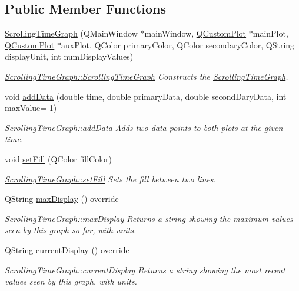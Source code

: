 \subsection*{Public Member Functions}
\begin{DoxyCompactItemize}
\item 
\hyperlink{class_scrolling_time_graph_ac7af242514d5770d99d90743a24163ca}{Scrolling\+Time\+Graph} (Q\+Main\+Window $\ast$main\+Window, \hyperlink{class_q_custom_plot}{Q\+Custom\+Plot} $\ast$main\+Plot, \hyperlink{class_q_custom_plot}{Q\+Custom\+Plot} $\ast$aux\+Plot, Q\+Color primary\+Color, Q\+Color secondary\+Color, Q\+String display\+Unit, int num\+Display\+Values)
\begin{DoxyCompactList}\small\item\em \hyperlink{class_scrolling_time_graph_ac7af242514d5770d99d90743a24163ca}{Scrolling\+Time\+Graph\+::\+Scrolling\+Time\+Graph} Constructs the \hyperlink{class_scrolling_time_graph}{Scrolling\+Time\+Graph}. \end{DoxyCompactList}\item 
void \hyperlink{class_scrolling_time_graph_af26f732b60d98c521ea93709db8f70cc}{add\+Data} (double time, double primary\+Data, double second\+Dary\+Data, int max\+Value=-\/1)
\begin{DoxyCompactList}\small\item\em \hyperlink{class_scrolling_time_graph_af26f732b60d98c521ea93709db8f70cc}{Scrolling\+Time\+Graph\+::add\+Data} Adds two data points to both plots at the given time. \end{DoxyCompactList}\item 
void \hyperlink{class_scrolling_time_graph_a651e6922d732be7084c207cc94257bd7}{set\+Fill} (Q\+Color fill\+Color)
\begin{DoxyCompactList}\small\item\em \hyperlink{class_scrolling_time_graph_a651e6922d732be7084c207cc94257bd7}{Scrolling\+Time\+Graph\+::set\+Fill} Sets the fill between two lines. \end{DoxyCompactList}\item 
Q\+String \hyperlink{class_scrolling_time_graph_a3d0314f268e3eeb7396733147f710ef0}{max\+Display} () override
\begin{DoxyCompactList}\small\item\em \hyperlink{class_scrolling_time_graph_a3d0314f268e3eeb7396733147f710ef0}{Scrolling\+Time\+Graph\+::max\+Display} Returns a string showing the maximum values seen by this graph so far, with units. \end{DoxyCompactList}\item 
Q\+String \hyperlink{class_scrolling_time_graph_ae27ff79b4314b792ecdd27fc6115e0bf}{current\+Display} () override
\begin{DoxyCompactList}\small\item\em \hyperlink{class_scrolling_time_graph_ae27ff79b4314b792ecdd27fc6115e0bf}{Scrolling\+Time\+Graph\+::current\+Display} Returns a string showing the most recent values seen by this graph. with units. \end{DoxyCompactList}\end{DoxyCompactItemize}
